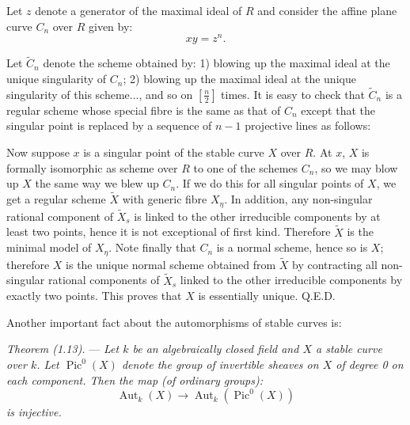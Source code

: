 \documentclass[10pt]{article}
\newcommand{\Aut}{\operatorname{Aut}}
\newcommand{\Pic}{\operatorname{Pic}}
\newcommand{\QED}{\hfill Q.E.D.}
\begin{document}
Let $z$ denote a generator of the maximal ideal of $R$ and consider the affine plane curve $C_n$ over $R$ given by:
\[
xy=z^n.
\]


Let $\widetilde C_n$ denote the scheme obtained by: 1) blowing up the maximal ideal at the unique singularity of $C_n$; 2) blowing up the maximal ideal at the unique singularity of this scheme..., and so on $\left[\frac n2\right]$ times. It is easy to check that $\widetilde C_n$ is a regular scheme whose special fibre is the same as that of $C_n$ except that the singular point is replaced by a sequence of $n-1$ projective lines as follows:

\begin{center}
\end{center}

Now suppose $x$ is a singular point of the stable curve $X$ over $R$. At $x$, $X$ is formally isomorphic as scheme over $R$ to one of the schemes $C_n$, so we may blow up $X$ the same way we blew up $C_n$. If we do this for all singular points of $X$, we get a regular scheme $\widetilde X$ with generic fibre $X_\eta$. In addition, any non-singular rational component of $\widetilde X_s$ is linked to the other irreducible components by at least two points, hence it is not exceptional of first kind. Therefore $\widetilde X$ is the minimal model of $X_\eta$. Note finally that $C_n$ is a normal scheme, hence so is $X$; therefore $X$ is the unique normal scheme obtained from $\widetilde X$ by contracting all non-singular rational components of $\widetilde X_s$ linked to the other irreducible components by exactly two points. This proves that $X$ is essentially unique. \QED

Another important fact about the automorphisms of stable curves is:

\medskip
\noindent\emph{Theorem (1.13).} --- \emph{Let $k$ be an algebraically closed field and $X$ a stable curve over $k$. Let $\Pic^0(X)$ denote the group of invertible sheaves on $X$ of degree 0 on each component. Then the map (of ordinary groups):}
\[
\Aut_k(X)\longrightarrow \Aut_k(\Pic^0(X))
\]
\emph{is injective.}
\end{document}

